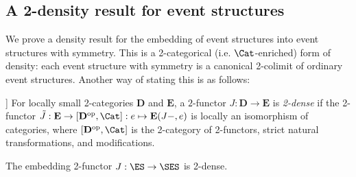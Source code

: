 \subsection{A 2-density result for event structures}
\label{subsec:2density}

\newcommand{\bE}{\mathbf{E}}
\newcommand{\bC}{\mathbf{C}}
\newcommand{\bD}{\mathbf{D}}

We prove a density result for the embedding of event structures into event structures with symmetry. This is a 2-categorical (i.e. $\Cat$-enriched) form of density: each event structure with symmetry is a canonical 2-colimit of  ordinary event structures. Another way of stating this is as follows:

\newcommand{\op}{\mathrm{op}}

\begin{definition}[e.g. [17]]
For locally small 2-categories $\bD$ and $\bE$, a $2$-functor $J : \bD \rightarrow \bE$ is \emph{2-dense} if the 2-functor $\tilde{J} : \bE \to [\bD^\op, \Cat] : e \mapsto \bE(J-, e)$ is locally an isomorphism of categories, where $[\bD^\op, \Cat]$ is the 2-category of 2-functors, strict natural transformations, and modifications. 
\end{definition}

\begin{theorem}
The embedding 2-functor $J : \ES \to \SES$ is 2-dense.
\end{theorem}

